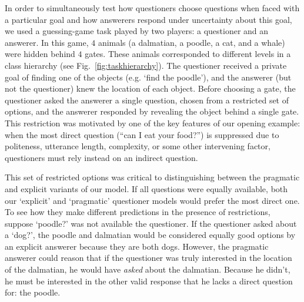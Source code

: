\documentclass[12pt, floatsintext, man]{apa6}
\begin{document}
In order to simultaneously test how questioners choose questions when faced with a particular goal and how answerers respond  under uncertainty about this goal, we used a guessing-game task played by two players: a questioner and an answerer. In this game, $4$ animals (a dalmatian, a poodle, a cat, and a whale) were hidden behind $4$ gates. These animals corresponded to different levels in a class hierarchy (see Fig.~\ref{fig:taskhierarchy}). The questioner received a private goal of finding one of the objects (e.g. `find the poodle'), and the answerer (but not the questioner) knew the location of each object. Before choosing a gate, the questioner asked the answerer a single question, chosen from a restricted set of options, and the answerer responded by revealing the object behind a single gate. This restriction was motivated by one of the key features of our opening example: when the most direct question (``can I eat your food?'') is suppressed due to politeness, utterance length, complexity, or some other intervening factor, questioners must rely instead on an indirect question. 

This set of restricted options was critical to distinguishing between the pragmatic and explicit variants of our model. If all questions were equally available, both our `explicit' and `pragmatic' questioner models would prefer the most direct one. To see how they make different predictions in the presence of restrictions, suppose `poodle?' was not available the questioner. If the questioner asked about a `dog?', the poodle and dalmatian would be considered equally good options by an explicit answerer because they are both dogs. However, the pragmatic answerer could reason that if the questioner was truly interested in the location of the dalmatian, he would have \emph{asked} about the dalmatian. Because he didn't, he must be interested in the other valid response that he lacks a direct question for: the poodle. 
\end{document}
